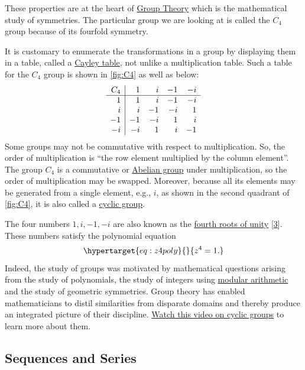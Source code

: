 \documentclass[
  a4paper,
]{article}
\begin{document}
These properties are at the heart of
\href{https://en.wikipedia.org/wiki/Group_(mathematics)}{Group Theory}
which is the mathematical study of symmetries. The particular group we
are looking at is called the \(C_4\) group because of its fourfold
symmetry.

It is customary to enumerate the transformations in a group by
displaying them in a table, called a
\href{https://en.wikipedia.org/wiki/Cayley_table}{Cayley table}, not
unlike a multiplication table. Such a table for the \(C_4\) group is
shown in \cref{fig:C4} as well as below: \[
\begin{array}{r | r  r  r  r}
C_{4} & 1  & i & -1 & -i\\
\hline
1 & 1 & i & -1 & -i\\
i & i & -1 & -i  & 1\\
-1 & -1 & -i & 1 & i\\
-i & -i & 1  & i & -1\\
\end{array}
\] Some groups may not be commutative with respect to multiplication.
So, the order of multiplication is ``the row element multiplied by the
column element''. The group \(C_4\) is a commutative or
\href{https://en.wikipedia.org/wiki/Abelian_group}{Abelian group} under
multiplication, so the order of multiplication may be swapped. Moreover,
because all its elements may be generated from a single element, e.g.,
\(i\), as shown in the second quadrant of \cref{fig:C4}, it is also
called a \href{https://en.wikipedia.org/wiki/Cyclic_group}{cyclic
group}.

The four numbers \(1, i, -1, -i\) are also known as the
\href{https://mathworld.wolfram.com/RootofUnity.html}{fourth roots of
unity} {[}\protect\hyperlink{ref-honner2021}{3}{]}. These numbers
satisfy the polynomial equation
\begin{equation}\protect\hypertarget{eq:z4poly}{}{
z^4 = 1.
}\label{eq:z4poly}\end{equation} Indeed, the study of groups was
motivated by mathematical questions arising from the study of
polynomials, the study of integers using
\href{https://en.wikipedia.org/wiki/Modular_arithmetic}{modular
arithmetic} and the study of geometric symmetries. Group theory has
enabled mathematicians to distil similarities from disparate domains and
thereby produce an integrated picture of their discipline.
\href{https://www.youtube.com/watch?v=8A84sA1YuPw}{Watch this video on
cyclic groups} to learn more about them.

\hypertarget{sequences-and-series}{%
\subsection{Sequences and Series}\label{sequences-and-series}}
\end{document}
